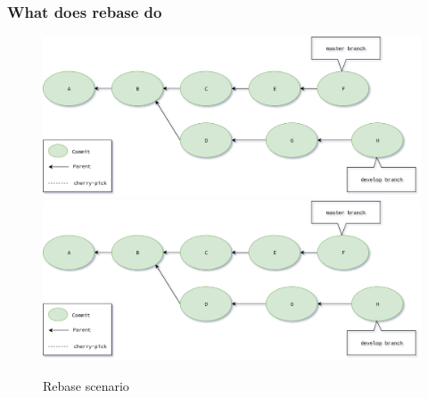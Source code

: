 \begin{frame}[fragile]
    \frametitle{What does rebase do}
    \begin{figure}
        \begin{center}
            {
                \includegraphics[width=1\textwidth,keepaspectratio]{./images/Rebase.png}
            }
            {
                \includegraphics[height=0.75\textheight,keepaspectratio]{./images/Rebase.png}
            }
            \caption{Rebase scenario}
        \end{center}
    \end{figure}
\end{frame}

